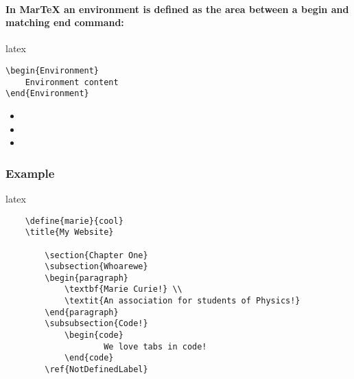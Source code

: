 \paragraph{In MarTeX an environment is defined as the area between a begin and matching end command:}
\begin{code}{latex}
\begin{verbatim}
\begin{Environment} 
    Environment content
\end{Environment}
\end{verbatim} 
\end{code}

\begin{itemize}
    \item{}
    \item{}
    \item{}
\end{itemize}


\subsubsection{Example}
\begin{code}{latex} 
\begin{verbatim}
    \define{marie}{cool}
    \title{My Website}
    
        \section{Chapter One}
        \subsection{Whoarewe}
        \begin{paragraph}
            \textbf{Marie Curie!} \\
            \textit{An association for students of Physics!}
        \end{paragraph}
        \subsubsection{Code!}
            \begin{code}
                    We love tabs in code!
            \end{code}       
        \ref{NotDefinedLabel}
     
\end{verbatim} 
\end{code}

